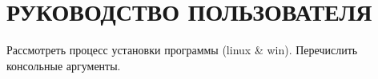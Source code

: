 \section[Руководство пользователя]{РУКОВОДСТВО ПОЛЬЗОВАТЕЛЯ}
\label{sec:user_manual}

Рассмотреть процесс установки программы (linux \& win).
Перечислить консольные аргументы.







